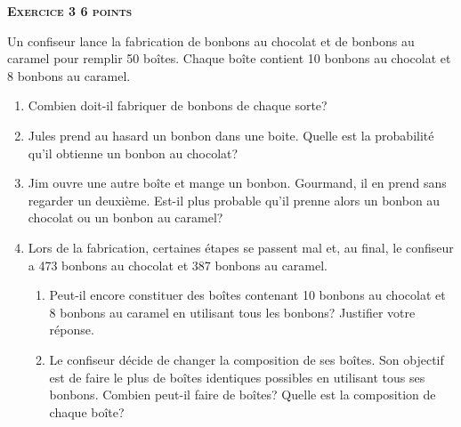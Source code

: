 \textbf{\textsc{Exercice 3 \hfill 6 points}}

\medskip

Un confiseur lance la fabrication de bonbons au chocolat et de bonbons au
caramel pour remplir 50 boîtes. Chaque boîte contient 10 bonbons au chocolat et 8 bonbons au caramel.

\medskip

\begin{enumerate}
\item Combien doit-il fabriquer de bonbons de chaque sorte?
\item Jules prend au hasard un bonbon dans une boite. Quelle est la probabilité qu'il
obtienne un bonbon au chocolat?
\item Jim ouvre une autre boîte et mange un bonbon. Gourmand, il en prend sans regarder un
deuxième. Est-il plus probable qu'il prenne alors un bonbon au chocolat ou un bonbon au caramel?
\item Lors de la fabrication, certaines étapes se passent mal et, au final, le confiseur a 473 bonbons
au chocolat et 387 bonbons au caramel.
	\begin{enumerate}
		\item Peut-il encore constituer des boîtes contenant 10 bonbons au chocolat et 8 bonbons au
caramel en utilisant tous les bonbons? Justifier votre réponse.
		\item Le confiseur décide de changer la composition de ses boîtes. Son objectif est de faire le plus de boîtes identiques possibles en utilisant tous ses bonbons. Combien peut-il faire de boîtes?
Quelle est la composition de chaque boîte?
	\end{enumerate}
\end{enumerate}

\vspace{0,5cm}

